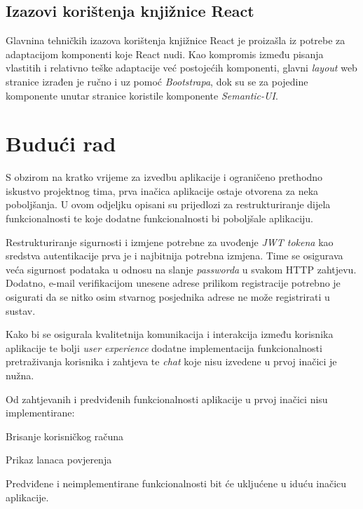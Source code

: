 	
		
		\subsection{Izazovi korištenja knjižnice React}
		Glavnina tehničkih izazova korištenja knjižnice React je proizašla iz potrebe za adaptacijom komponenti koje React nudi. Kao kompromis između pisanja vlastitih i relativno teške adaptacije već postojećih komponenti, glavni \textit{layout} web stranice izrađen je ručno i uz pomoć \textit{Bootstrapa}, dok su se za pojedine komponente unutar stranice koristile komponente \textit{Semantic-UI}.
		
		
		 \eject
		 \section{Budući rad}
		 S obzirom na kratko vrijeme za izvedbu aplikacije i ograničeno prethodno iskustvo projektnog tima, prva inačica aplikacije ostaje otvorena za neka poboljšanja. U ovom odjeljku opisani su prijedlozi za restrukturiranje dijela funkcionalnosti te koje dodatne funkcionalnosti bi poboljšale aplikaciju.\newline 
		 
		 Restrukturiranje sigurnosti i izmjene potrebne za uvođenje \textit{JWT tokena} kao sredstva autentikacije prva je i najbitnija potrebna izmjena. Time se osigurava veća sigurnost podataka u odnosu na slanje \textit{passworda} u svakom HTTP zahtjevu. Dodatno, e-mail verifikacijom unesene adrese prilikom registracije potrebno je osigurati da se nitko osim stvarnog posjednika adrese ne može registrirati u sustav. \newline
		  
		 
		 Kako bi se osigurala kvalitetnija komunikacija i interakcija između korisnika aplikacije te bolji \textit{user experience} dodatne implementacija funkcionalnosti pretraživanja korisnika i zahtjeva te \textit{chat} koje nisu izvedene u prvoj inačici je nužna. \newline
		 
		 Od zahtjevanih i predviđenih funkcionalnosti aplikacije u prvoj inačici nisu implementirane:
		 \begin{packed_enum}
		 	
		 	\item Brisanje korisničkog računa
		 	\item Prikaz lanaca povjerenja

		\end{packed_enum}		
		Predviđene i neimplementirane funkcionalnosti bit će ukljućene u iduću inačicu aplikacije. 	
		 
